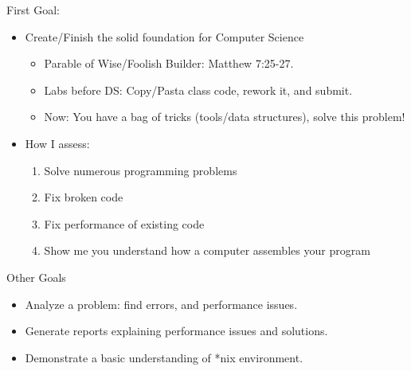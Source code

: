 \documentclass{beamer}
\begin{document}
\begin{frame}{First Goal:}
\begin{itemize}
\item Create/Finish the solid foundation for Computer Science
\begin{itemize}
\item Parable of Wise/Foolish Builder: Matthew 7:25-27.
\item Labs before DS: Copy/Pasta class code, rework it, and submit.
\item Now: You have a bag of tricks (tools/data structures), solve this problem!
\end{itemize}
\item How I assess:
\begin{enumerate}
\item Solve numerous programming problems
\item Fix broken code
\item Fix performance of existing code
\item Show me you understand how a computer assembles your program
\end{enumerate}
\end{itemize}
\end{frame}

\begin{frame}{Other Goals}
\begin{itemize}
\item Analyze a problem: find errors, and performance issues.
\item Generate reports explaining performance issues and solutions.
\item Demonstrate a basic understanding of *nix environment.
\end{itemize}
\end{frame}
\end{document}
